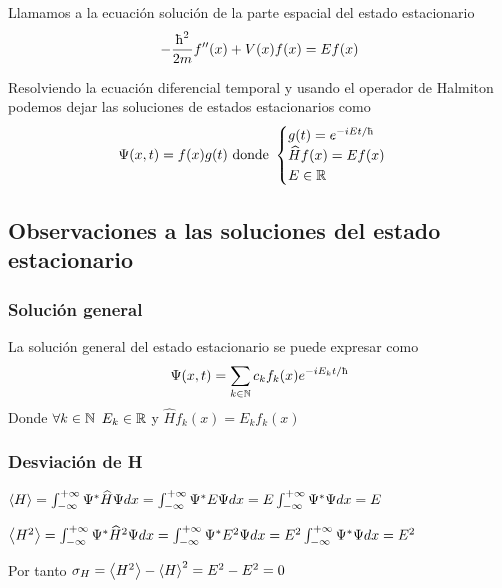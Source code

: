 \begin{definicion}
    Llamamos  a la ecuación solución de la parte espacial del estado estacionario
    \begin{equation}
        \label{eq:ecuacion_schrodinger_tempoespacial}
        -\frac{\planckbarsymbol^2}{2m}f''(x)+V(x)f(x)= Ef(x)
    \end{equation}
\end{definicion}

Resolviendo la ecuación diferencial temporal y usando el operador de Halmiton podemos dejar las soluciones de estados estacionarios como
\begin{equation}
    \label{eq:solucion_estado_estacionario}
    \fuconda(x,t)=f(x)g(t)\text{ donde }
    \begin{cases}
        g(t)=e^{-iEt/\planckbarsymbol}\\
        \widehat{H}f(x)=Ef(x)\\
        E\in\R
    \end{cases}
\end{equation}

\subsection{Observaciones a las soluciones del estado estacionario}\label{subsec:observaciones-a-las-soluciones-del-estado-estacionario}

\subsubsection{Solución general}
La solución general del estado estacionario se puede expresar como
\begin{equation}
    \label{eq:solucion_general_estado_estacionario}
    \fuconda(x,t)=\sum_{k\in\N}c_k f_k(x)e^{-iE_k t/\planckbarsymbol}
\end{equation}
Donde $\forall k\in\mathbb{N}$ $E_k\in\mathbb{R}$ y $\widehat{H}f_k(x)=E_k f_k(x)$

\subsubsection{Desviación de H}
$\left\langle H\right\rangle = \int_{-\infty}^{+\infty}\Psi^* \widehat{H}\Psi dx = \int_{-\infty}^{+\infty}\Psi^* E\Psi dx=E\int_{-\infty}^{+\infty}\Psi^* \Psi dx = E$

$\left\langle H^2\right\rangle = \int_{-\infty}^{+\infty}\Psi^* \widehat{H}^2\Psi dx = \int_{-\infty}^{+\infty}\Psi^* E^2\Psi dx=E^2\int_{-\infty}^{+\infty}\Psi^* \Psi dx = E^2$

Por tanto $\sigma_H=\left\langle H^2\right\rangle-\left\langle H\right\rangle^2=E^2-E^2=0$
